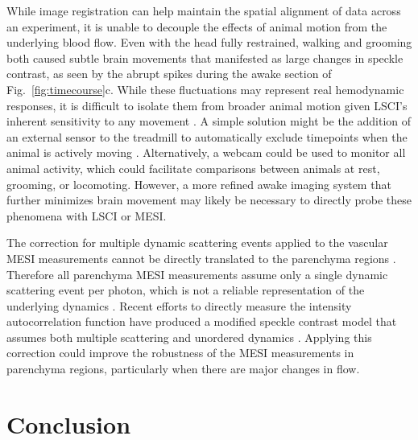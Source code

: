 \documentclass[review]{elsarticle}
\begin{document}
While image registration can help maintain the spatial alignment of data across an experiment, it is unable to decouple the effects of animal motion from the underlying blood flow. Even with the head fully restrained, walking and grooming both caused subtle brain movements that manifested as large changes in speckle contrast, as seen by the abrupt spikes during the awake section of Fig.~\ref{fig:timecourse}c. While these fluctuations may represent real hemodynamic responses, it is difficult to isolate them from broader animal motion given LSCI's inherent sensitivity to any movement \cite{Richards:2014kx}. A simple solution might be the addition of an external sensor to the treadmill to automatically exclude timepoints when the animal is actively moving \cite{Dombeck:2007gr}. Alternatively, a webcam could be used to monitor all animal activity, which could facilitate comparisons between animals at rest, grooming, or locomoting. However, a more refined awake imaging system that further minimizes brain movement may likely be necessary to directly probe these phenomena with LSCI or MESI.

The correction for multiple dynamic scattering events applied to the vascular MESI measurements cannot be directly translated to the parenchyma regions \cite{Kazmi:2015du}. Therefore all parenchyma MESI measurements assume only a single dynamic scattering event per photon, which is not a reliable representation of the underlying dynamics \cite{Davis:2015ij}. Recent efforts to directly measure the intensity autocorrelation function have produced a modified speckle contrast model that assumes both multiple scattering and unordered dynamics \cite{Postnov.2020}. Applying this correction could improve the robustness of the MESI measurements in parenchyma regions, particularly when there are major changes in flow.


\section{Conclusion}
\end{document}
